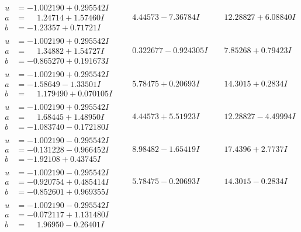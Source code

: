 \documentclass[1p]{elsarticle_modified}
\theoremstyle{definition}
\begin{document}
$$\begin{array}{c|c|c}
\begin{aligned}
u &= -1.002190 + 0.295542 I \\
a &= \phantom{-}1.24714 + 1.57460 I \\
b &= -1.23357 + 0.71721 I\end{aligned}
 & \phantom{-}4.44573 - 7.36784 I & \phantom{-}12.28827 + 6.08840 I \\ \hline\begin{aligned}
u &= -1.002190 + 0.295542 I \\
a &= \phantom{-}1.34882 + 1.54727 I \\
b &= -0.865270 + 0.191673 I\end{aligned}
 & \phantom{-}0.322677 - 0.924305 I & \phantom{-}7.85268 + 0.79423 I \\ \hline\begin{aligned}
u &= -1.002190 + 0.295542 I \\
a &= -1.58649 - 1.33501 I \\
b &= \phantom{-}1.179490 + 0.070105 I\end{aligned}
 & \phantom{-}5.78475 + 0.20693 I & \phantom{-}14.3015 + 0.2834 I \\ \hline\begin{aligned}
u &= -1.002190 + 0.295542 I \\
a &= \phantom{-}1.68445 + 1.48950 I \\
b &= -1.083740 - 0.172180 I\end{aligned}
 & \phantom{-}4.44573 + 5.51923 I & \phantom{-}12.28827 - 4.49994 I \\ \hline\begin{aligned}
u &= -1.002190 - 0.295542 I \\
a &= -0.131228 - 0.966452 I \\
b &= -1.92108 + 0.43745 I\end{aligned}
 & \phantom{-}8.98482 - 1.65419 I & \phantom{-}17.4396 + 2.7737 I \\ \hline\begin{aligned}
u &= -1.002190 - 0.295542 I \\
a &= -0.920754 + 0.485414 I \\
b &= -0.852601 + 0.969355 I\end{aligned}
 & \phantom{-}5.78475 - 0.20693 I & \phantom{-}14.3015 - 0.2834 I \\ \hline\begin{aligned}
u &= -1.002190 - 0.295542 I \\
a &= -0.072117 + 1.131480 I \\
b &= \phantom{-}1.96950 - 0.26401 I\end{aligned}

\end{array}$$
\end{document}
